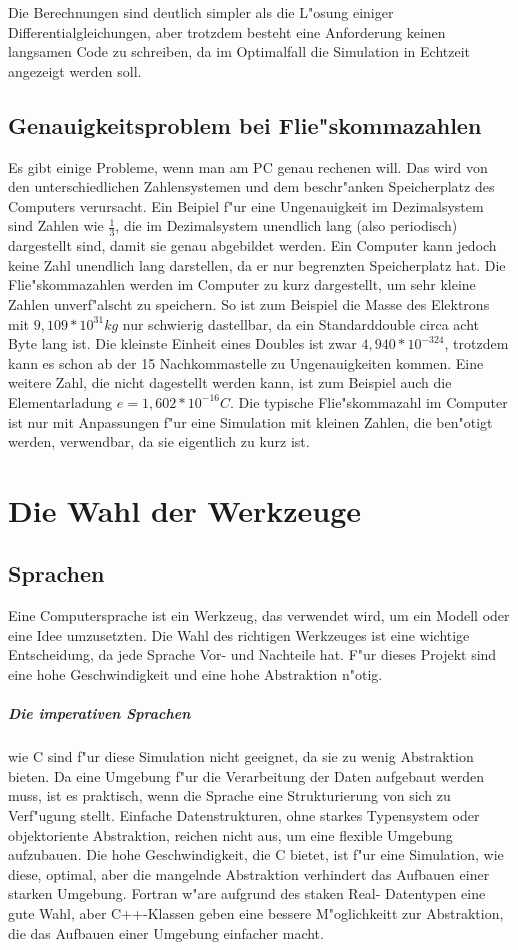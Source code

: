 \documentclass[14pt, a4paper]{report}
\begin{document}
Die Berechnungen sind deutlich simpler als die L"osung einiger Differentialgleichungen,
aber trotzdem besteht eine Anforderung keinen langsamen Code zu schreiben, da im 
Optimalfall die Simulation in Echtzeit angezeigt werden soll.


\section{Genauigkeitsproblem bei Flie"skommazahlen}
Es gibt einige Probleme, wenn man am PC genau rechenen will. Das wird von den 
unterschiedlichen Zahlensystemen und dem beschr"anken Speicherplatz des Computers 
verursacht. Ein Beipiel f"ur eine Ungenauigkeit im Dezimalsystem sind Zahlen
wie $\frac{1}{3}$, die im Dezimalsystem unendlich lang (also periodisch)
 dargestellt sind, damit sie genau
abgebildet werden. Ein Computer kann jedoch keine Zahl unendlich lang darstellen, da
er nur begrenzten Speicherplatz hat. Die Flie"skommazahlen werden im Computer zu kurz
dargestellt, um sehr kleine Zahlen unverf"alscht zu speichern. So ist zum Beispiel die 
Masse des Elektrons mit $9,109 * 10^{31} kg$ nur schwierig dastellbar, da ein 
Standarddouble circa acht Byte lang ist. Die kleinste Einheit eines Doubles ist zwar
$4,940 * 10^{-324}$, trotzdem kann es schon ab der 15 Nachkommastelle zu 
Ungenauigkeiten kommen. Eine weitere Zahl, die nicht dagestellt werden
kann, ist zum Beispiel auch die Elementarladung $e = 1,602 * 10^{-16} C$. Die typische 
Flie"skommazahl im Computer ist nur mit Anpassungen f"ur eine Simulation mit kleinen
Zahlen, die ben"otigt werden, verwendbar, da sie eigentlich zu kurz ist.

\chapter{Die Wahl der Werkzeuge}
\section{Sprachen}
Eine Computersprache ist ein Werkzeug, das verwendet wird, um ein Modell oder eine Idee
umzusetzten. Die Wahl des richtigen Werkzeuges ist eine wichtige Entscheidung, da jede
Sprache Vor- und Nachteile hat. F"ur dieses Projekt sind eine hohe Geschwindigkeit 
und eine hohe Abstraktion n"otig.

\paragraph{Die imperativen Sprachen} wie C sind f"ur diese Simulation
nicht geeignet, da sie zu wenig Abstraktion bieten. Da eine Umgebung f"ur die 
Verarbeitung der Daten aufgebaut werden 
muss, ist es praktisch, wenn die Sprache eine Strukturierung von sich zu Verf"ugung 
stellt. Einfache Datenstrukturen, ohne starkes Typensystem oder 
objektoriente Abstraktion,
reichen nicht aus, um eine flexible Umgebung aufzubauen. Die hohe Geschwindigkeit, die
C bietet, ist f"ur eine Simulation, wie diese, optimal, aber die mangelnde Abstraktion
verhindert das Aufbauen einer starken Umgebung. Fortran w"are aufgrund des staken Real-
Datentypen eine gute Wahl, aber C++-Klassen geben eine bessere M"oglichkeitt zur 
Abstraktion, die das Aufbauen einer Umgebung einfacher macht.
\end{document}
